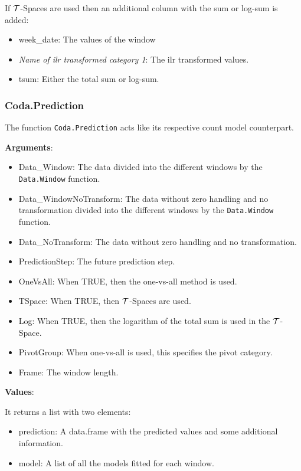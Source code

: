 If $\mathcal{T}$-Spaces are used then an additional column with the sum or log-sum is added:

\begin{itemize}
	\item week\_date: The values of the window
	\item \textit{Name of ilr transformed category 1}: The ilr transformed values.
	\item tsum: Either the total sum or log-sum. 
\end{itemize}

\subsubsection{Coda.Prediction}
\label{sec:Coda.Prediction}

The function \texttt{Coda.Prediction} acts like its respective count model counterpart.

\textbf{Arguments}:

\begin{itemize}
	\item Data\_Window: The data divided into the different windows by the \texttt{Data.Window} function.
	\item Data\_WindowNoTransform: The data without zero handling and no transformation divided into the different windows by the \texttt{Data.Window} function.
	\item Data\_NoTransform: The data without zero handling and no transformation.
	\item PredictionStep: The future prediction step.
	\item OneVsAll: When TRUE, then the one-vs-all method is used.
	\item TSpace: When TRUE, then $\mathcal{T}$-Spaces are used.
	\item Log: When TRUE, then the logarithm of the total sum is used in the $\mathcal{T}$-Space.
	\item PivotGroup: When one-vs-all is used, this specifies the pivot category.
	\item Frame: The window length.
\end{itemize}

\textbf{Values}:

It returns a list with two elements:

\begin{itemize}
	\item prediction: A data.frame with the predicted values and some additional information.
	\item model: A list of all the models fitted for each window. 
\end{itemize}

